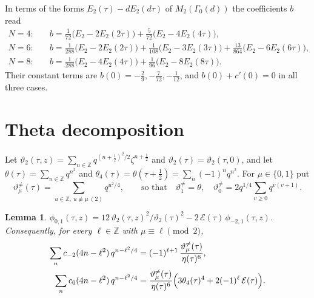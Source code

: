 \documentclass[11pt]{amsart}
\newtheorem{lemma}[theorem]{Lemma}
\theoremstyle{definition}
\newcommand{\ZZ}{\mathbb{Z}}
\newcommand{\Ei}{\mathcal{E}}
\newcommand{\vtn}{\vartheta^{\neq}}
\begin{document}
In terms of the forms $E_2(\tau)-dE_2(d\tau)$ of $M_2(\Gamma_0(d))$ the coefficients $b$ read
\begin{align*}
N=4:&\quad b=\tfrac1{72}\bigl(E_2-2E_2(2\tau)\bigr)+\tfrac5{72}\bigl(E_2-4E_2(4\tau)\bigr),\\
N=6:&\quad b=\tfrac1{288}\bigl(E_2-2E_2(2\tau)\bigr)+\tfrac1{108}\bigl(E_2-3E_2(3\tau)\bigr)+\tfrac{13}{864}\bigl(E_2-6E_2(6\tau)\bigr),\\
N=8:&\quad b=\tfrac1{288}\bigl(E_2-4E_2(4\tau)\bigr)+\tfrac1{96}\bigl(E_2-8E_2(8\tau)\bigr).
\end{align*} Their constant terms are $b(0)=-\frac29,-\frac7{72},-\frac1{12}$, and $b(0)+c'(0)=0$ in all three cases.

\section{Theta decomposition}\label{sec:theta}

Let $\vartheta_2(\tau,z)=\sum_{n\in\ZZ}q^{(n+\frac12)^2/2}\zeta^{n+\frac12}$ and $\vartheta_2(\tau)=\vartheta_2(\tau,0)$, and let $\theta(\tau)=\sum_{n\in\ZZ}q^{n^2}$ and $\theta_4(\tau)=\theta(\tau+\frac12)=\sum_n(-1)^nq^{n^2}$. For $\mu\in\{0,1\}$ put
\[
\vtn_\mu(\tau)=\sum_{u\in\ZZ,\ u\not\equiv\mu\ (2)}q^{u^2/4},\qquad\text{so that}\quad \vtn_1=\theta,\quad \vtn_0=2q^{1/4}\sum_{v\ge0}q^{v(v+1)}.
\]

\begin{lemma}\label{lem:theta}
$\phi_{0,1}(\tau,z)=12\,\vartheta_2(\tau,z)^2/\vartheta_2(\tau)^2-2\,\Ei(\tau)\,\phi_{-2,1}(\tau,z)$. Consequently, for every $\ell\in\ZZ$ with $\mu\equiv\ell\pmod 2$,
\begin{align*}
\sum_{n}c_{-2}(4n-\ell^2)\,q^{n-\ell^2/4}&=(-1)^{\ell+1}\,\frac{\vtn_\mu(\tau)}{\eta(\tau)^6},\\
\sum_{n}c_{0}(4n-\ell^2)\,q^{n-\ell^2/4}&=\frac{\vtn_\mu(\tau)}{\eta(\tau)^6}\Bigl(3\theta_4(\tau)^4+2(-1)^\ell\,\Ei(\tau)\Bigr).
\end{align*}
\end{lemma}
\end{document}
